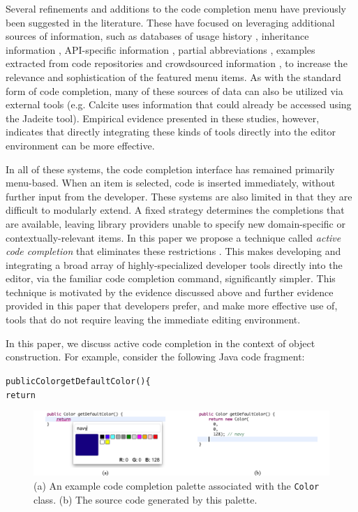 \documentclass[10pt, conference, compsocconf]{IEEEtran}
\begin{document}
Several refinements and additions to the code completion menu have previously been suggested in the literature. These have focused on leveraging additional sources of information, such as databases of usage history \cite{robbes_how_2008}\cite{HouPletcher2011}, inheritance information \cite{HouPletcher2011}, API-specific information \cite{HouPletcher2011}\cite{Lee+2008}, partial abbreviations \cite{Han+2009}, examples extracted from code repositories \cite{bruch_learning_2009}\cite{Brandt+2010} and crowdsourced information \cite{mooty_calcite:_2010}\cite{SnipMatch}, to increase the relevance and sophistication of the featured menu items. As with the standard form of code completion, many of these sources of data can also be utilized via external tools (e.g. Calcite \cite{mooty_calcite:_2010} uses information that could already be accessed using the Jadeite \cite{conf/vl/StylosFYM09} tool). Empirical evidence presented in these studies, however, indicates that directly integrating these kinds of tools directly into the editor environment can be more effective.

In all of these systems, the code completion interface has remained primarily menu-based. When an item is selected, code is inserted immediately, without further input from the developer. These systems are also limited in that they are difficult to modularly extend. A fixed strategy determines the completions that are available, leaving library providers unable to specify new domain-specific or contextually-relevant items. 
In this paper we propose a technique called {\it active code completion} that eliminates these restrictions \cite{ACC_VLHCC}. This  makes developing and integrating a broad array of highly-specialized developer tools directly into the editor, via the familiar code completion command, significantly simpler. This technique is motivated by the evidence discussed above and further evidence provided in this paper that developers prefer, and make more effective use of, tools that do not require leaving the immediate editing environment.

In this paper, we discuss active code completion in the context of object construction. For example, consider the following Java code fragment:

\begin{alltt}
  public Color getDefaultColor() \{
      return \textvisiblespace
\end{alltt}

\begin{figure}\label{color}
\begin{center}
\includegraphics[width=\textwidth]{color_palette.png}\end{center}
\caption{(a) An example code completion palette associated with the \texttt{Color} class. (b) The source code generated by this palette.}
\end{figure}
\end{document}
